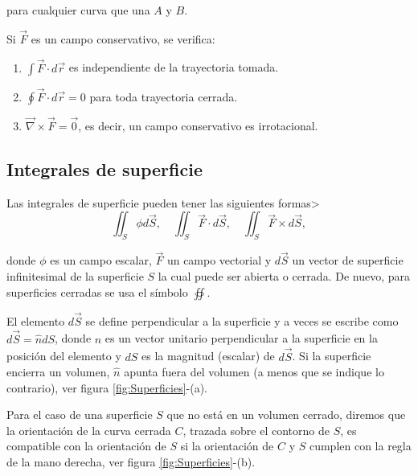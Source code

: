 para cualquier curva que una $A$ y $B$.

Si $\Vec{F}$ es un campo conservativo, se verifica:
\begin{enumerate}
\item $\int \vec{F} \cdot d\vec{r}$ es independiente de la trayectoria tomada.

\item $\oint\vec{F} \cdot d\vec{r} = 0$ para toda trayectoria cerrada.

\item $\vec{\nabla} \times \vec{F} = \vec{0}$, es decir, un campo conservativo es irrotacional.
\end{enumerate}

\subsection{Integrales de superficie}

Las integrales de superficie pueden tener las siguientes formas>
\begin{equation*}
\iint_S \phi d\vec{S}, \quad \iint_S \vec{F} \cdot d\vec{S}, \quad \iint_S \vec{F} \times d\vec{S},
\end{equation*}

donde $\phi$ es un campo escalar, $\vec{F}$ un campo vectorial y $d\vec{S}$ un vector de superficie infinitesimal de la superficie $S$ la cual puede ser abierta o cerrada. De nuevo, para superficies cerradas se usa el símbolo $\oiint$.

El elemento $d\vec{S}$ se define perpendicular a la superficie y a veces se escribe como $d\vec{S} = \hat{n} dS$, donde $\hat{n}$ es un vector unitario perpendicular a la superficie en la posición del elemento y $dS$ es la magnitud (escalar) de $d\vec{S}$. Si la superficie encierra un volumen, $\hat{n}$ apunta fuera del volumen (a menos que se indique lo contrario), ver figura \ref{fig:Superficies}-(a).

Para el caso de una superficie $S$ que no está en un volumen cerrado, diremos que la orientación de la curva cerrada $C$, trazada sobre el contorno de $S$, es compatible con la orientación de $S$ si la orientación de $C$ y $S$ cumplen con la regla de la mano derecha, ver figura \ref{fig:Superficies}-(b).

